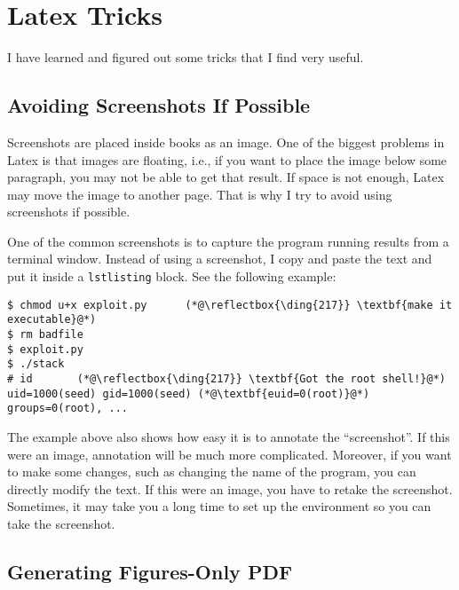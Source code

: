 
\chapter{Latex Tricks}
\label{chapter:tricks}

\thispagestyle{empty}

I have learned and figured out some tricks that I find very useful. 


\minitoc
\newpage




\section{Avoiding Screenshots If Possible}

Screenshots are placed inside books as an image. One of the biggest
problems in Latex is that images are floating, i.e., if you want to place
the image below some paragraph, you may not be able to get that result.
If space is not enough, Latex may move the image to another page. That is
why I try to avoid using screenshots if possible.

One of the common screenshots is to capture the program
running results from a terminal window. Instead of using a screenshot, 
I copy and paste the text and put it inside a \texttt{lstlisting} block. 
See the following example: 

\begin{lstlisting}
$ chmod u+x exploit.py      (*@\reflectbox{\ding{217}} \textbf{make it executable}@*)
$ rm badfile
$ exploit.py
$ ./stack
# id       (*@\reflectbox{\ding{217}} \textbf{Got the root shell!}@*)
uid=1000(seed) gid=1000(seed) (*@\textbf{euid=0(root)}@*) groups=0(root), ...
\end{lstlisting}

The example above also shows how easy it is to annotate the
``screenshot''. If this were an image, annotation will be much
more complicated. Moreover, if you want to make some changes, such as 
changing the name of the program, you can directly modify the text. If this
were an image, you have to retake the screenshot. Sometimes, it may
take you a long time to set up the environment so you can take
the screenshot. 



\section{Generating Figures-Only PDF}


